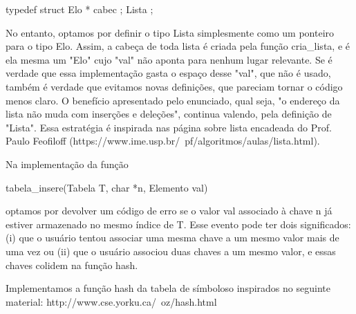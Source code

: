 \documentclass{article}
\begin{document}
\begin{spverbatim}
  typedef struct {
  Elo * cabec ;
} Lista ;
\end{spverbatim} \medskip

No entanto, optamos por definir o tipo Lista simplesmente como um ponteiro para o tipo Elo. Assim, a cabeça de toda lista é criada pela função cria\_lista, e é ela mesma um "Elo" cujo "val" não aponta para nenhum lugar relevante. Se é verdade que essa implementação gasta o espaço desse "val", que não é usado, também é verdade que evitamos novas definições, que pareciam tornar o código menos claro. O benefício apresentado pelo enunciado, qual seja, "o endereço da lista não muda com inserções e deleções", continua valendo, pela definição de "Lista". Essa estratégia é inspirada nas página sobre lista encadeada do Prof. Paulo Feofiloff (https://www.ime.usp.br/~pf/algoritmos/aulas/lista.html).

Na implementação da função
\begin{spverbatim}
  tabela_insere(Tabela T, char *n, Elemento val)
\end{spverbatim} \medskip
optamos por devolver um código de erro se o valor val associado à chave n já estiver armazenado no mesmo índice de T. Esse evento pode ter dois significados: (i) que o usuário tentou associar uma mesma chave a um mesmo valor mais de uma vez ou (ii) que o usuário associou duas chaves a um mesmo valor, e essas chaves colidem na função hash.

Implementamos a função hash da tabela de símboloso inspirados no seguinte material: http://www.cse.yorku.ca/~oz/hash.html 
\end{document}
